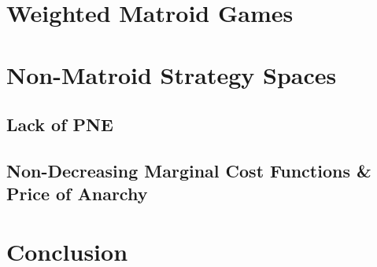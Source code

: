 \documentclass{beamer}
\begin{document}
\section{Weighted Matroid Games}
\begin{frame}
\end{frame}

\section{Non-Matroid Strategy Spaces}
\subsection{Lack of PNE}
\begin{frame}
\end{frame}

\subsection{Non-Decreasing Marginal Cost Functions \& Price of Anarchy}
\begin{frame}
\end{frame}

\section{Conclusion}
\begin{frame}
\end{frame}
\end{document}

